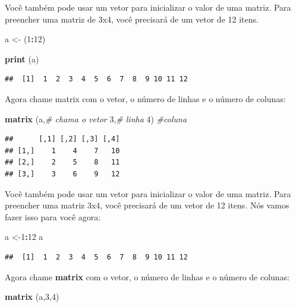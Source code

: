 \documentclass[
]{book}
\newenvironment{Shaded}{\begin{snugshade}}{\end{snugshade}}
\newcommand{\CommentTok}[1]{\textcolor[rgb]{0.56,0.35,0.01}{\textit{#1}}}
\newcommand{\DecValTok}[1]{\textcolor[rgb]{0.00,0.00,0.81}{#1}}
\newcommand{\KeywordTok}[1]{\textcolor[rgb]{0.13,0.29,0.53}{\textbf{#1}}}
\newcommand{\NormalTok}[1]{#1}
\newcommand{\OperatorTok}[1]{\textcolor[rgb]{0.81,0.36,0.00}{\textbf{#1}}}
\newcommand{\StringTok}[1]{\textcolor[rgb]{0.31,0.60,0.02}{#1}}
\begin{document}
Você também pode usar um vetor para inicializar o valor de uma matriz. Para preencher uma matriz de 3x4, você precisará de um vetor de 12 itens.

\begin{Shaded}
\begin{Highlighting}[]
\NormalTok{a <-}\StringTok{ }\NormalTok{(}\DecValTok{1}\OperatorTok{:}\DecValTok{12}\NormalTok{)}

\KeywordTok{print}\NormalTok{ (a)}
\end{Highlighting}
\end{Shaded}

\begin{verbatim}
##  [1]  1  2  3  4  5  6  7  8  9 10 11 12
\end{verbatim}

Agora chame matrix com o vetor, o número de linhas e o número de colunas:

\begin{Shaded}
\begin{Highlighting}[]
\KeywordTok{matrix}\NormalTok{ (a,}\CommentTok{# chama o vetor}
        \DecValTok{3}\NormalTok{,}\CommentTok{# linha}
        \DecValTok{4}\NormalTok{) }\CommentTok{#coluna}
\end{Highlighting}
\end{Shaded}

\begin{verbatim}
##      [,1] [,2] [,3] [,4]
## [1,]    1    4    7   10
## [2,]    2    5    8   11
## [3,]    3    6    9   12
\end{verbatim}

Você também pode usar um vetor para inicializar o valor de uma matriz. Para preencher uma matriz 3x4, você precisará de um vetor de 12 itens. Nós vamos fazer isso para você agora:

\begin{Shaded}
\begin{Highlighting}[]
\NormalTok{a <-}\DecValTok{1}\OperatorTok{:}\DecValTok{12}
\NormalTok{a}
\end{Highlighting}
\end{Shaded}

\begin{verbatim}
##  [1]  1  2  3  4  5  6  7  8  9 10 11 12
\end{verbatim}

Agora chame \textbf{matrix} com o vetor, o número de linhas e o número de colunas:

\begin{Shaded}
\begin{Highlighting}[]
\KeywordTok{matrix}\NormalTok{ (a,}\DecValTok{3}\NormalTok{,}\DecValTok{4}\NormalTok{)}
\end{Highlighting}
\end{Shaded}
\end{document}
